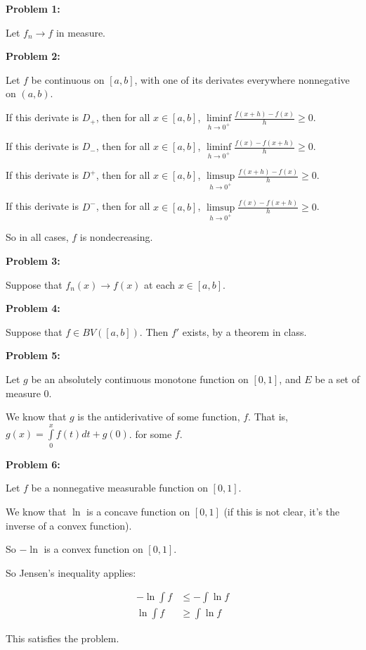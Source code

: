 \documentclass[a4paper,12pt]{article}
\newcommand{\shunt}{\vspace{20mm}}
\begin{document}
{\bf Problem 1:} 

Let $f_n \to f$ in measure. 

\shunt

{\bf Problem 2:} 

Let $f$ be continuous on $[a,b]$, with one of its derivates everywhere nonnegative on $(a,b)$.

If this derivate is $D_+$, then for all $x \in [a,b]$, $\liminf\limits_{h \to 0^+} \frac{f(x+h)-f(x)}{h} \geq 0$.

If this derivate is $D_-$, then for all $x \in [a,b]$, $\liminf\limits_{h \to 0^+} \frac{f(x)-f(x+h)}{h} \geq 0$.

If this derivate is $D^+$, then for all $x \in [a,b]$, $\limsup\limits_{h \to 0^+} \frac{f(x+h)-f(x)}{h} \geq 0$.

If this derivate is $D^-$, then for all $x \in [a,b]$, $\limsup\limits_{h \to 0^+} \frac{f(x)-f(x+h)}{h} \geq 0$.

So in all cases, $f$ is nondecreasing. 

\shunt

{\bf Problem 3:} 

Suppose that $f_n(x) \to f(x)$ at each $x \in [a,b]$.

\shunt

{\bf Problem 4:} 

Suppose that $f \in BV([a,b])$. Then $f'$ exists, by a theorem in class. 

\shunt

{\bf Problem 5:} 

Let $g$ be an absolutely continuous monotone function on $[0,1]$, and $E$ be a set of measure $0$.

We know that $g$ is the antiderivative of some function, $f$. That is, $g(x) = \int\limits_0^x f(t)dt + g(0)$. for some $f$. 

\shunt

{\bf Problem 6:} 

Let $f$ be a nonnegative measurable function on $[0,1]$.

We know that $\ln$ is a concave function on $[0,1]$ (if this is not clear, it's the inverse of a convex function).

So $-\ln$ is a convex function on $[0,1]$.

So Jensen's inequality applies:

\begin{align*}
-\ln \int f &\leq -\int\ln f \\
\ln \int f & \geq \int \ln f
\end{align*}

This satisfies the problem.

\shunt
\end{document}
